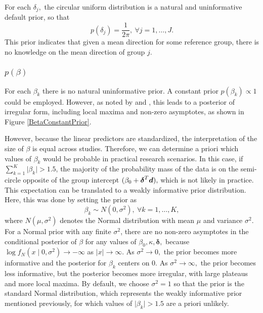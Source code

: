 For each \( \delta_j,\)  the circular uniform distribution is a natural and uninformative default prior, so that
\begin{equation}
p(\delta_j) = \frac{1}{2 \pi}, ~ \forall j = 1, \dots, J.
\end{equation}
This prior indicates that given a mean direction for some reference group, there is no knowledge on the mean direction of group \( j.\)

\subsubsection{$p(\beta)$} \label{betaprior}

For each \(\beta_k\) there is no natural uninformative prior. A constant prior \( p(\beta_k) \propto 1 \) could be employed. However, as noted by \citet{fisher1995statistical} and \citet{gill2010}, this leads to a posterior of irregular form, including local maxima and non-zero asymptotes, as shown in Figure \ref{BetaConstantPrior}.

However, because the linear predictors are standardized, the interpretation of the size of \( \beta \) is equal across studies. Therefore, we can determine a priori which values of \( \beta_k \) would be probable in practical research scenarios. In this case, if \( \sum_{k=1}^K \vert \beta_k \vert > 1.5 \), the majority of the probability mass of the data is on the semi-circle opposite of the group intercept \( (\beta_0 + \boldsymbol{\delta}^T \boldsymbol{d}),\) which is not likely in practice. This expectation can be translated to a weakly informative prior distribution. Here, this was done by setting the prior as
\begin{equation}
\beta_k \sim N(0, \sigma^2), ~ \forall k = 1, \dots, K,
\end{equation}
 where \( N(\mu, \sigma^2) \) denotes the Normal distribution with mean \( \mu \) and variance \( \sigma^2\). For a Normal prior with any finite \(\sigma^2\), there are no non-zero asymptotes in the conditional posterior of \(\beta\) for any values of \(\beta_0, \kappa, \boldsymbol{\delta},\) because \(\log f_N(x \mid 0, \sigma^2) \rightarrow -\infty\) as \(\vert x \vert \rightarrow \infty.\) As \( \sigma^2 \rightarrow 0,\) the prior becomes more informative and the posterior for \( \beta_k \) centers on 0. As \( \sigma^2 \rightarrow \infty,\) the prior becomes less informative, but the posterior becomes more irregular, with large plateaus and more local maxima.   By default, we choose \( \sigma^2 = 1\) so that the prior is the standard Normal distribution, which represents the weakly informative prior mentioned previously, for which values of \( \vert\beta_k\vert > 1.5 \) are a priori unlikely.

